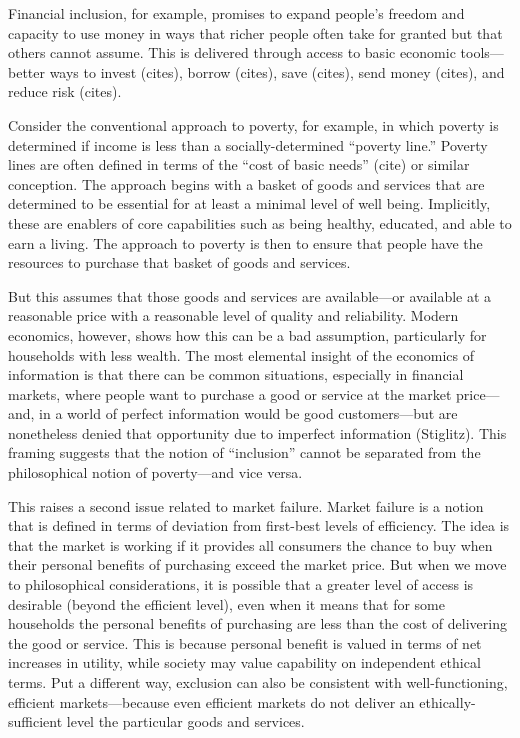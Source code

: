 \documentclass[letterpaper, 12pt]{article}
\begin{document}
Financial inclusion, for example, promises to expand people's freedom and capacity to use money in ways that richer people often take for granted but that others cannot assume. This is delivered through access to basic economic tools---better ways to invest (cites), borrow (cites), save (cites), send money (cites), and reduce risk (cites). 

Consider the conventional approach to poverty, for example, in which poverty is determined if income is less than a socially-determined ``poverty line.'' Poverty lines are often defined in terms of the ``cost of basic needs'' (cite) or similar conception. The approach begins with a basket of goods and services that are determined to be essential for at least a minimal level of well being. Implicitly, these are enablers of core capabilities such as being healthy, educated, and able to earn a living. The approach to poverty is then to ensure that people have the resources to purchase that basket of goods and services. 

But this assumes that those goods and services are available---or available at a reasonable price with a reasonable level of quality and reliability. Modern economics, however, shows how this can be a bad assumption, particularly for households with less wealth. The most elemental insight of the economics of information is that there can be common situations, especially in financial markets, where people want to purchase a good or service at the market price---and, in a world of perfect information would be good customers---but are nonetheless denied that opportunity due to imperfect information (Stiglitz).
This framing suggests that the notion of ``inclusion'' cannot be separated from the philosophical notion of poverty---and vice versa. 

This raises a second issue related to market failure. Market failure is a notion that is defined in terms of deviation from first-best levels of efficiency. The idea is that the market is working if it provides all consumers the chance to buy when their personal benefits of purchasing exceed the market price. But when we move to philosophical considerations, it is possible that a greater level of access is desirable (beyond the efficient level), even when it means that for some households the personal benefits of purchasing are less than the cost of delivering the good or service. This is because personal benefit is valued in terms of net increases in utility, while society may value capability on independent ethical terms. Put a different way,  exclusion can also be consistent with well-functioning, efficient markets---because even efficient markets do not deliver an ethically-sufficient level the particular goods and services.
\end{document}
